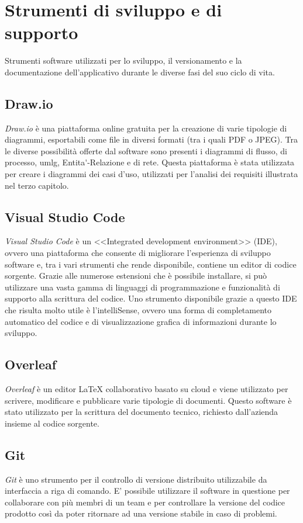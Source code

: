 \section{Strumenti di sviluppo e di supporto}
\label{sez:strumenti-smartworking}
Strumenti software utilizzati per lo sviluppo, il versionamento e la documentazione dell'applicativo durante le diverse fasi del suo ciclo di vita.

\subsection*{Draw.io}
\textit{Draw.io} è una piattaforma online gratuita per la creazione di varie tipologie di diagrammi, esportabili come file in diversi formati (tra i quali PDF o JPEG). Tra le diverse possibilità offerte  dal software sono presenti i diagrammi di flusso, di processo, \gls{umlg}, \gls{Entita'-Relazione} e di rete. Questa piattaforma è stata utilizzata per creare i diagrammi dei casi d'uso, utilizzati per l'analisi dei requisiti illustrata nel terzo capitolo.

\subsection*{Visual Studio Code}
\textit{Visual Studio Code} è un <<Integrated development environment>> (IDE), ovvero una piattaforma che consente di migliorare l'esperienza di sviluppo software e, tra i vari strumenti che rende disponibile, contiene un editor di codice sorgente. Grazie alle numerose estensioni che è possibile installare, si può utilizzare una vasta gamma di linguaggi di programmazione e funzionalità di supporto alla scrittura del codice. Uno strumento disponibile grazie a questo IDE che risulta molto utile è l'intelliSense, ovvero una forma di completamento automatico del codice e di visualizzazione grafica di informazioni durante lo sviluppo.

\subsection*{Overleaf}
\textit{Overleaf} è un editor LaTeX collaborativo basato su cloud e viene utilizzato per scrivere, modificare e pubblicare varie tipologie di documenti. Questo software è stato utilizzato per la scrittura del documento tecnico, richiesto dall'azienda insieme al codice sorgente.

\subsection*{Git}
\textit{Git} è uno strumento per il controllo di versione distribuito utilizzabile da interfaccia a riga di comando. E' possibile utilizzare il software in questione per collaborare con più membri di un team e per controllare la versione del codice prodotto così da poter ritornare ad una versione stabile in caso di problemi.

